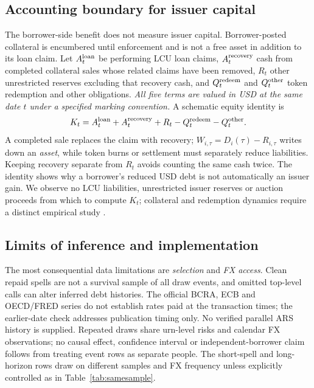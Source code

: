 \documentclass[sn-vancouver,Numbered]{sn-jnl}
\begin{document}
\subsection{Accounting boundary for issuer capital}
The borrower-side benefit does not measure issuer capital. Borrower-posted collateral is encumbered until enforcement and is not a free asset in addition to its loan claim. Let $A_t^{\rm loan}$ be performing LCU loan claims, $A_t^{\rm recovery}$ cash from completed collateral sales whose related claims have been removed, $R_t$ other unrestricted reserves excluding that recovery cash, and $Q_t^{\rm redeem}$ and $Q_t^{\rm other}$ token redemption and other obligations. \emph{All five terms are valued in USD at the same date $t$ under a specified marking convention.} A schematic equity identity is
\begin{equation}
K_t=A_t^{\rm loan}+A_t^{\rm recovery}+R_t
-Q_t^{\rm redeem}-Q_t^{\rm other}.
\label{eq:balance}
\end{equation}
A completed sale replaces the claim with recovery; $W_{i,\tau}=D_i(\tau)-R_{i,\tau}$ writes down an \emph{asset}, while token burns or settlement must separately reduce liabilities. Keeping recovery separate from $R_t$ avoids counting the same cash twice. The identity shows why a borrower's reduced USD debt is not automatically an issuer gain. We observe no LCU liabilities, unrestricted issuer reserves or auction proceeds from which to compute $K_t$; collateral and redemption dynamics require a distinct empirical study \cite{GortonZhang2023,Arner2020,BIS2023}.

\subsection{Limits of inference and implementation}
The most consequential data limitations are \emph{selection} and \emph{FX access}. Clean repaid spells are not a survival sample of all draw events, and omitted top-level calls can alter inferred debt histories. The official BCRA, ECB and OECD/FRED series do not establish rates paid at the transaction times; the earlier-date check addresses publication timing only. No verified parallel ARS history is supplied. Repeated draws share urn-level risks and calendar FX observations; no causal effect, confidence interval or independent-borrower claim follows from treating event rows as separate people. The short-spell and long-horizon rows draw on different samples and FX frequency unless explicitly controlled as in Table~\ref{tab:samesample}.
\end{document}
